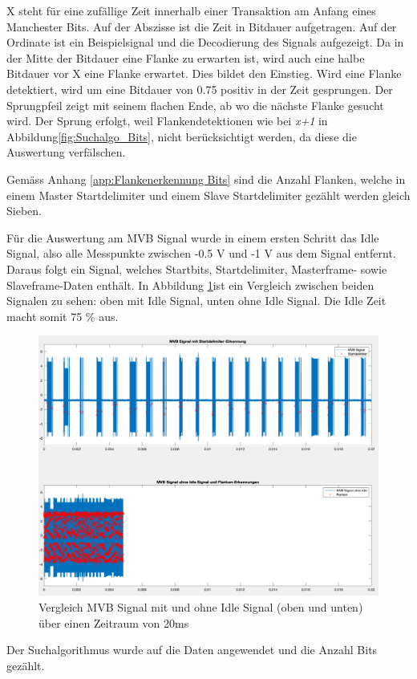 X steht für eine zufällige Zeit innerhalb einer Transaktion am Anfang eines Manchester Bits. Auf der Abszisse ist die Zeit in Bitdauer aufgetragen. Auf der Ordinate ist ein Beispielsignal und die Decodierung des Signals aufgezeigt. Da in der Mitte der Bitdauer eine Flanke zu erwarten ist, wird auch eine halbe Bitdauer vor X eine Flanke erwartet. Dies bildet den Einstieg. Wird eine Flanke detektiert, wird um eine Bitdauer von 0.75 positiv in der Zeit gesprungen. Der Sprungpfeil zeigt mit seinem flachen Ende, ab wo die nächste Flanke gesucht wird. Der Sprung erfolgt, weil Flankendetektionen wie bei \textit{x+1} in Abbildung\ref{fig:Suchalgo_Bits},  nicht berücksichtigt werden, da diese die Auswertung verfälschen.

Gemäss Anhang \ref{app:Flankenerkennung Bits} sind die Anzahl Flanken, welche in einem Master Startdelimiter und einem Slave Startdelimiter gezählt werden gleich Sieben.

Für die Auswertung am MVB Signal wurde in einem ersten Schritt das Idle Signal, also alle Messpunkte zwischen -0.5 V und -1 V aus dem Signal entfernt. Daraus folgt ein Signal,  welches Startbits, Startdelimiter, Masterframe- sowie Slaveframe-Daten enthält. In Abbildung \ref{fig:ReineDaten}ist ein Vergleich zwischen beiden Signalen zu sehen: oben mit Idle Signal, unten ohne Idle Signal. Die Idle Zeit macht somit 75 \% aus. 

\begin{figure}[H]
    \centering
    \includegraphics[width=0.75\linewidth]{Figures/Chap3/Busauslastung/Vergleich_MVB_mit_ohne_Idle.png}
    \caption{Vergleich MVB Signal mit und ohne Idle Signal (oben und unten) über einen Zeitraum von 20ms}
    \label{fig:ReineDaten}
\end{figure}

Der Suchalgorithmus wurde auf die Daten angewendet und die Anzahl Bits gezählt.

